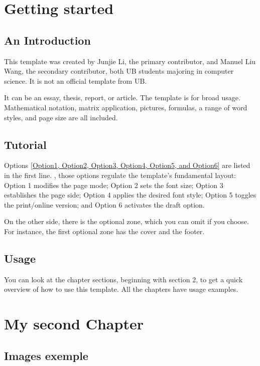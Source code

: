 \chapter{Getting started}

\section{An Introduction}
This template was created by Junjie Li, the primary contributor, and Manuel Liu Wang, the secondary contributor, both UB students majoring in computer science. It is not an official template from UB.

It can be an essay, thesis, report, or article. The template is for broad usage. Mathematical notation, matrix application, pictures, formulas, a range of word styles, and page size are all included.


\section{Tutorial}
Options \underline{[Option1, Option2, Option3, Option4, Option5, and Option6]} are listed in the first line. , those options regulate the template's fundamental layout: Option 1 modifies the page mode; Option 2 sets the font size; Option 3 establishes the page side; Option 4 applies the desired font style; Option 5 toggles the print/online version; and Option 6 activates the draft option.

On the other side, there is the optional zone, which you can omit if you choose. For instance, the first optional zone has the cover and the footer.


\section{Usage}

You can look at the chapter sections, beginning with section 2, to get a quick overview of how to use this template. All the chapters have usage examples.    




\chapter{My second Chapter}

\section{Images exemple}


